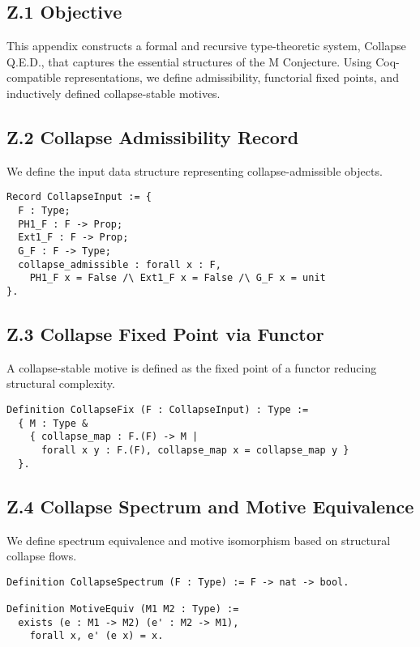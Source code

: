 \documentclass[11pt]{article}
\begin{document}
\subsection*{Z.1 Objective}

This appendix constructs a formal and recursive type-theoretic system, Collapse Q.E.D., that captures the essential structures of the M Conjecture. Using Coq-compatible representations, we define admissibility, functorial fixed points, and inductively defined collapse-stable motives.

\subsection*{Z.2 Collapse Admissibility Record}

We define the input data structure representing collapse-admissible objects.

\begin{lstlisting}[language=Coq, caption=Collapse Admissibility Record]
Record CollapseInput := {
  F : Type;
  PH1_F : F -> Prop;
  Ext1_F : F -> Prop;
  G_F : F -> Type;
  collapse_admissible : forall x : F,
    PH1_F x = False /\ Ext1_F x = False /\ G_F x = unit
}.
\end{lstlisting}

\subsection*{Z.3 Collapse Fixed Point via Functor}

A collapse-stable motive is defined as the fixed point of a functor reducing structural complexity.

\begin{lstlisting}[language=Coq, caption=Collapse Fixpoint Construction]
Definition CollapseFix (F : CollapseInput) : Type :=
  { M : Type &
    { collapse_map : F.(F) -> M |
      forall x y : F.(F), collapse_map x = collapse_map y }
  }.
\end{lstlisting}

\subsection*{Z.4 Collapse Spectrum and Motive Equivalence}

We define spectrum equivalence and motive isomorphism based on structural collapse flows.

\begin{lstlisting}[language=Coq, caption=Spectrum and Equivalence Definitions]
Definition CollapseSpectrum (F : Type) := F -> nat -> bool.

Definition MotiveEquiv (M1 M2 : Type) :=
  exists (e : M1 -> M2) (e' : M2 -> M1),
    forall x, e' (e x) = x.
\end{lstlisting}
\end{document}
